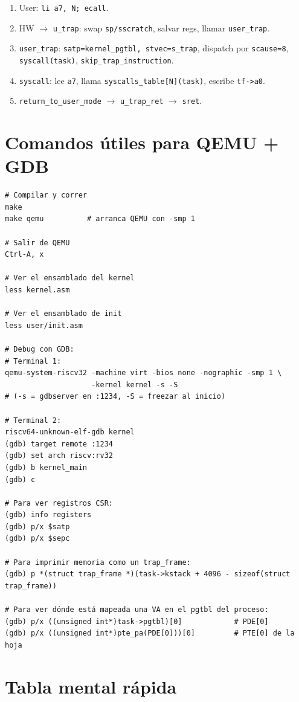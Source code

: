 \documentclass[11pt,a4paper]{article}
\begin{document}
\begin{enumerate}[leftmargin=*,nosep]
    \item User: \texttt{li a7, N; ecall}.
    \item HW $\to$ \texttt{u\_trap}: swap \texttt{sp/sscratch},
        salvar regs, llamar \texttt{user\_trap}.
    \item \texttt{user\_trap}: \texttt{satp=kernel\_pgtbl,
        stvec=s\_trap}, dispatch por \texttt{scause=8},
        \texttt{syscall(task)}, \texttt{skip\_trap\_instruction}.
    \item \texttt{syscall}: lee \texttt{a7}, llama
        \texttt{syscalls\_table[N](task)}, escribe \texttt{tf->a0}.
    \item \texttt{return\_to\_user\_mode} $\to$ \texttt{u\_trap\_ret}
        $\to$ \texttt{sret}.
\end{enumerate}

\section{Comandos útiles para QEMU + GDB}

\begin{lstlisting}[style=shellstyle]
# Compilar y correr
make
make qemu          # arranca QEMU con -smp 1

# Salir de QEMU
Ctrl-A, x

# Ver el ensamblado del kernel
less kernel.asm

# Ver el ensamblado de init
less user/init.asm

# Debug con GDB:
# Terminal 1:
qemu-system-riscv32 -machine virt -bios none -nographic -smp 1 \
                    -kernel kernel -s -S
# (-s = gdbserver en :1234, -S = freezar al inicio)

# Terminal 2:
riscv64-unknown-elf-gdb kernel
(gdb) target remote :1234
(gdb) set arch riscv:rv32
(gdb) b kernel_main
(gdb) c

# Para ver registros CSR:
(gdb) info registers
(gdb) p/x $satp
(gdb) p/x $sepc

# Para imprimir memoria como un trap_frame:
(gdb) p *(struct trap_frame *)(task->kstack + 4096 - sizeof(struct trap_frame))

# Para ver dónde está mapeada una VA en el pgtbl del proceso:
(gdb) p/x ((unsigned int*)task->pgtbl)[0]            # PDE[0]
(gdb) p/x ((unsigned int*)pte_pa(PDE[0]))[0]         # PTE[0] de la hoja
\end{lstlisting}

\section{Tabla mental rápida}
\end{document}
